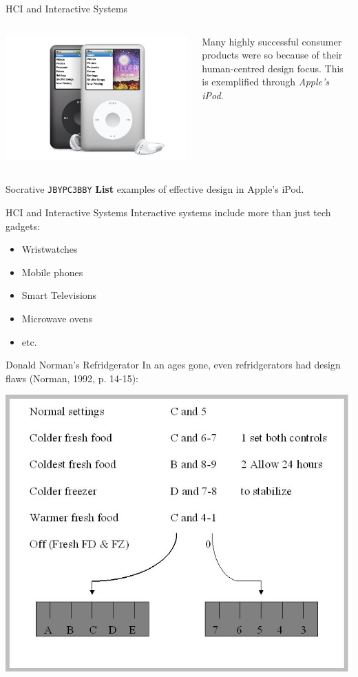 \begin{frame}{HCI and Interactive Systems}
	\begin{columns}[onlytextwidth]
		\begin{column}{0.45\textwidth}
			\includegraphics[height=14ex]{IPod.jpg}
		\end{column}
		\begin{column}{0.45\textwidth}
			Many highly successful consumer products were so because of their human-centred design focus. This
			is exemplified through \textit{Apple's iPod}.
		\end{column}
	\end{columns}
\end{frame}

\begin{frame}[fragile]{Socrative \texttt{JBYPC3BBY}}
    \textbf{List} examples of effective design in Apple's iPod.
\end{frame}

\begin{frame}{HCI and Interactive Systems}
	Interactive systems include more than just tech gadgets:
	
	\begin{itemize}
		\item Wristwatches
		\item Mobile phones
		\item Smart Televisions
		\item Microwave ovens
		\item etc.
	\end{itemize}
\end{frame}

\begin{frame}{Donald Norman's Refridgerator}
	In an ages gone, even refridgerators had design flaws (Norman, 1992, p. 14-15):
	
	\vspace{2ex}
			
	\includegraphics[height=24ex]{norman_fridge_controls.jpg}
\end{frame}

